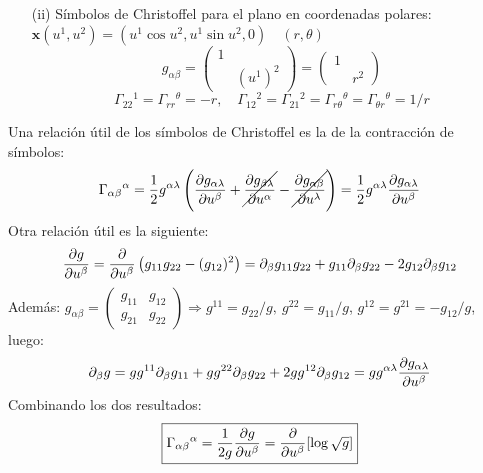 \begin{mybox}
\begin{enumerate}
        \item[(ii)] Símbolos de Christoffel para el plano en coordenadas polares:\\
        $
        \mathbf{x}(u^1,u^2)=(u^1\cos u^2,u^1 \sin u^2,0) \quad (r,\theta)
        $
        $$
        g_{\alpha \beta }=\left ( \begin{array}{cc}
            1 &  \\
             & (u^1)^2
        \end{array} \right )=\left ( \begin{array}{cc}
             1&  \\
             &r^2 
        \end{array} \right )
        $$
        $$
        \Gamma_{22}{}^1=\Gamma_{rr}{}^\theta =-r ,\quad \Gamma_{12}{}^2=\Gamma_{21}{}^2=\Gamma_{r\theta}{}^\theta =\Gamma_{\theta r}{}^\theta =1/r
        $$
    \end{enumerate}
\end{mybox}
Una relación útil de los símbolos de Christoffel es la de la contracción de símbolos:
$$
\Gamma_{\alpha \beta }{}^\alpha =\frac{1}{2}g^{\alpha \lambda}\left ( \pdv{g_{\alpha \lambda}}{u^\beta }+ \cancel{\pdv{g_{\beta  \lambda}}{u^\alpha }}-\cancel{\pdv{g_{\alpha \beta}}{u^\lambda  }}\right )=\frac{1}{2}g^{\alpha \lambda}\pdv{g_{\alpha \lambda }}{u^\beta }
$$
Otra relación útil es la siguiente:
$$
\pdv{g}{u^\beta }=\pdv{}{u^\beta }\left (g_{11}g_{22}-(g_{12})^2\right )=\partial_\beta g_{11} g_{22}+g_{11}\partial_\beta g_{22}-2g_{12}\partial_\beta g_{12}
$$
Además: $g_{\alpha \beta }=\left ( \begin{array}{cc}
     g_{11}&g_{12}  \\
     g_{21}& g_{22}
\end{array} \right )\Rightarrow  g^{11}=g_{22}/g,\ g^{22}=g_{11}/g$, $g^{12}=g^{21}=-g_{12}/g$, luego:
$$
\partial_\beta g=gg^{11}\partial_\beta g_{11}+gg^{22}\partial_\beta g_{22}+2gg^{12}\partial_\beta g_{12}=gg^{\alpha \lambda} \pdv{g_{\alpha \lambda }}{u^\beta }
$$
Combinando los dos resultados:
$$
\boxed{\Gamma_{\alpha \beta }{}^\alpha =\frac{1}{2g}\pdv{g}{u^\beta }=\pdv{}{u^\beta }[\log \sqrt{g}]}
$$
